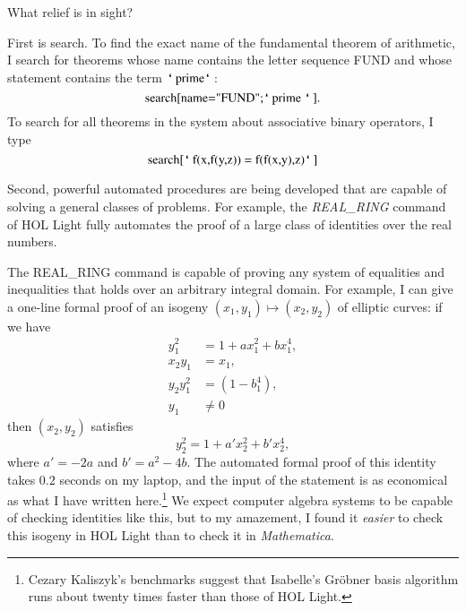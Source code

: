 \documentclass{llncs}
\newcommand{\ring}[1]{\mathbb{#1}}
\def\bq{\text{\tt {`}\,}}
\begin{document}
What relief is in sight?

First is search.  To find the exact name of the fundamental
theorem of arithmetic, I search for theorems whose name contains the
letter sequence FUND and whose statement contains the term $\bq\text{prime}\bq$:
\[
\text{search[name="FUND";\bq prime \bq]}.
\]
To search for all theorems in the system about associative binary operators, I type
\[
\text{search[\bq f(x,f(y,z)) = f(f(x,y),z)\bq]}
\]

Second, powerful automated procedures are being developed that are
capable of solving a general classes of problems.  For example, the
{\it REAL\_RING} command of HOL Light fully automates the proof of a
large class of identities over the real numbers.

The {REAL\_RING} command is capable of proving any system of
equalities and inequalities that holds over an arbitrary integral
domain.  For example, I can give a one-line formal proof of an isogeny
$(x_1,y_1) \mapsto (x_2,y_2)$ of elliptic curves: if we have
\begin{align*}
y_1^2 &= 1 + a x_1^2 + b x_1^4,\\
x_2 y_1&=x_1,\\
y_2 y_1^2&=(1 - b_1^4),\\
y_1&\ne 0
\end{align*}
then $(x_2,y_2)$ satisfies
\[
y_2^2 = 1 + a' x_2^2 + b' x_2^4,
\]
where $a' = -2a$ and $b' = a^2 - 4b$.  The automated formal proof of
this identity takes $0.2$ seconds on my laptop, and the input of the
statement is as economical as what I have written here.\footnote{
  Cezary Kaliszyk's benchmarks suggest that Isabelle's Gr\"obner basis algorithm
  runs about twenty times faster than those of HOL Light.
}  We expect computer
algebra systems to be capable of checking identities like this, but to
my amazement, I found it {\it easier} to check this isogeny in HOL
Light than to check it in {\it Mathematica}.
\end{document}
